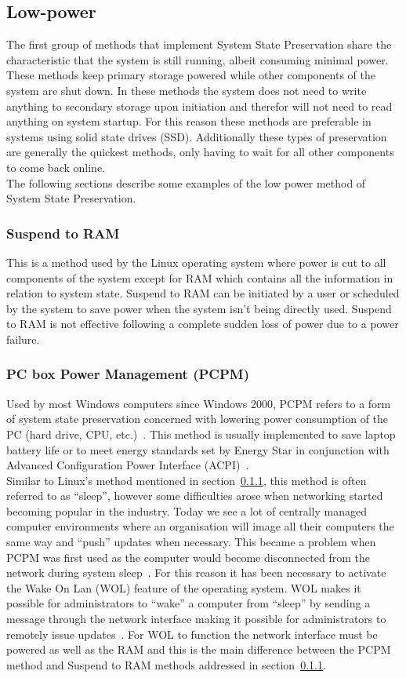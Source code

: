 \documentclass[a4paper,12pt]{article}
\begin{document}
\subsection{Low-power}\label{sec:lowpower}
The first group of methods that implement System State Preservation share the characteristic that the system is still running, albeit consuming minimal power. These methods keep primary storage powered while other components of the system are shut down. In these methods the system does not need to write anything to secondary storage upon initiation and therefor will not need to read anything on system startup. For this reason these methods are preferable in systems using solid state drives (SSD). Additionally these types of preservation are generally the quickest methods, only having to wait for all other components to come back online.
\\The following sections describe some examples of the low power method of System State Preservation.

\subsubsection{Suspend to RAM}\label{sec:stRam}
This is a method used by the Linux operating system where power is cut to all components of the system except for RAM which contains all the information in relation to system state\citep{Wiki}.
Suspend to RAM can be initiated by a user or scheduled by the system to save power when the system isn't being directly used. Suspend to RAM is not effective following a complete sudden loss of power due to a power failure.
\subsubsection{PC box Power Management (PCPM)}\label{sec:PCPM}
Used by most Windows computers since Windows 2000, PCPM refers to a form of system state preservation concerned with lowering power consumption of the PC (hard drive, CPU, etc.)~\citep{PCPM}. This method is usually implemented to save laptop battery life or to meet energy standards set by Energy Star in conjunction with Advanced Configuration Power Interface (ACPI)~\citep{PCPM}.
\\
Similar to Linux's method mentioned in section~\ref{sec:stRam}, this method is often referred to as ``sleep'', however some difficulties arose when networking started becoming popular in the industry. Today we see a lot of centrally managed computer environments where an organisation will image all their computers the same way and ``push'' updates when necessary. This became a problem when PCPM was first used as the computer would become disconnected from the network during system sleep~\citep{PCPM}. 
For this reason it has been necessary to activate the Wake On Lan (WOL) feature of the operating system. WOL makes it possible for administrators to ``wake'' a computer from ``sleep'' by sending a message through the network interface making it possible for administrators to remotely issue updates~\citep{WOL}. For WOL to function the network interface must be powered as well as the RAM and this is the main difference between the PCPM method and Suspend to RAM methods addressed in section~\ref{sec:stRam}.
\end{document}
